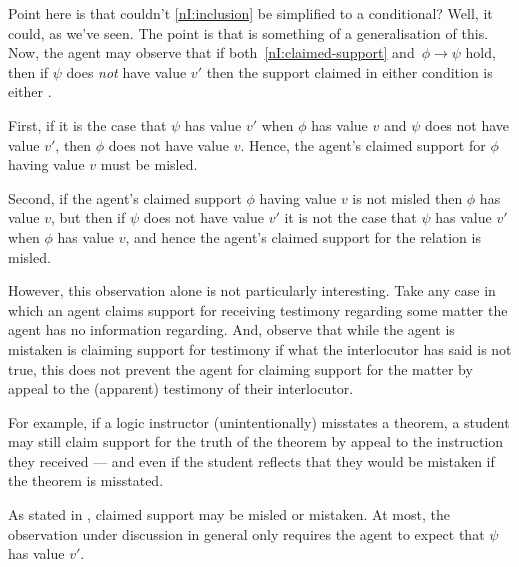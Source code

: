 \begin{note}
  {
    \color{red}
    Point here is that couldn't \ref{nI:inclusion} be simplified to a conditional?
    Well, it could, as we've seen.
    The point is that \nI{} is something of a generalisation of this.
  }
  Now, the agent may observe that if both~\ref{nI:claimed-support} and~\(\phi \rightarrow \psi\) hold, then if \(\psi\) does \emph{not} have value \(v'\) then the support claimed in either condition is either \mom{}.

  First, if it is the case that \(\psi\) has value \(v'\) when \(\phi\) has value \(v\) and \(\psi\) does not have value \(v'\), then \(\phi\) does not have value \(v\).
  Hence, the agent's claimed support for \(\phi\) having value \(v\) must be misled.

  Second, if the agent's claimed support \(\phi\) having value \(v\) is not misled then \(\phi\) has value \(v\), but then if \(\psi\) does not have value \(v'\) it is not the case that \(\psi\) has value \(v'\) when \(\phi\) has value \(v\), and hence the agent's claimed support for the relation is misled.

  However, this observation alone is not particularly interesting.
  Take any case in which an agent claims support for receiving testimony regarding some matter the agent has no information regarding.
  And, observe that while the agent is mistaken is claiming support for testimony if what the interlocutor has said is not true, this does not prevent the agent for claiming support for the matter by appeal to the (apparent) testimony of their interlocutor.

  For example, if a logic instructor (unintentionally) misstates a theorem, a student may still claim support for the truth of the theorem by appeal to the instruction they received --- and even if the student reflects that they would be mistaken if the theorem is misstated.

  As stated in \eiS{}, claimed support may be misled or mistaken.
  At most, the observation under discussion in general only requires the agent to expect that \(\psi\) has value \(v'\).

\end{note}


